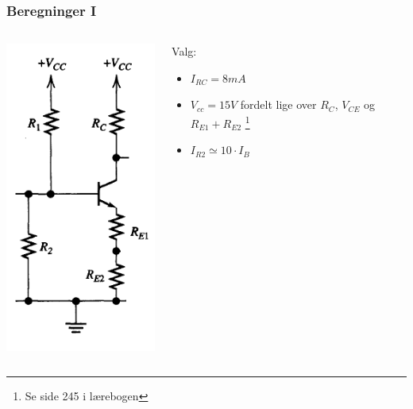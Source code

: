 \documentclass{beamer}
\begin{document}
\begin{frame}
	\frametitle{Beregninger I}
	\begin{columns}[onlytextwidth]
  \begin{column}{0.4\textwidth}
    \begin{center}
		\includegraphics[width=.8\textwidth]{images/trans_dc.png}
	\end{center}
  \end{column}
  \begin{column}{0.6\textwidth}
  	Valg:
    \begin{itemize}
	\item $I_{RC} = 8 mA$
	\item $V_{cc} = 15 V$ fordelt lige over $R_C$, $V_{CE}$ og $R_{E1}+R_{E2}$ \footnote{Se side 245 i lærebogen}
	\item $I_{R2} \simeq 10\cdot I_B$ 
	\end{itemize}
  \end{column}
\end{columns}
\end{frame}
\end{document}
